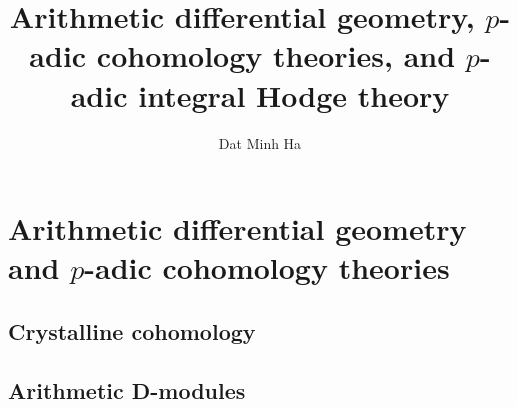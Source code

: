 

\setcounter{section}{-1}





	\title{Arithmetic differential geometry, \texorpdfstring{$p$}{}-adic cohomology theories, and \texorpdfstring{$p$}{}-adic integral Hodge theory}
	
	\author{Dat Minh Ha}
	\maketitle
	
	\begin{abstract}
	    
	\end{abstract}
	
	{
      \hypersetup{} 
      \tableofcontents %
    }
    
    \part{Arithmetic differential geometry and \texorpdfstring{$p$}{}-adic cohomology theories}
        \chapter{Crystalline cohomology}
            \begin{abstract}
                
            \end{abstract}
            
            \minitoc
            
            
            
            
            
        \chapter{Arithmetic D-modules}
            \begin{abstract}
                
            \end{abstract}
            
            \minitoc
            
            
            
